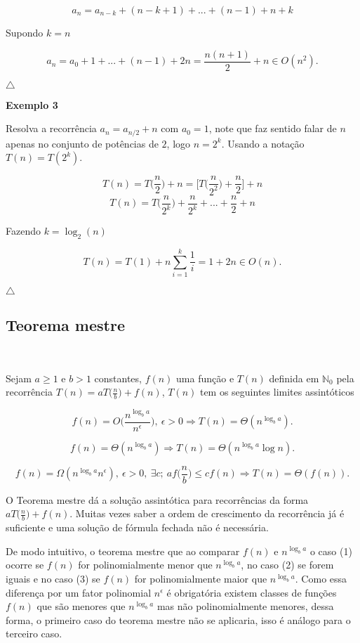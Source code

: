 \[a_n = a_{n-k} + (n-k+1) + ... + (n-1) + n + k\]

Supondo $k=n$

\[a_n = a_0 + 1 + ... + (n-1) + 2n = \frac{n(n+1)}{2} + n \in O(n^2).\]

{\raggedleft $\bigtriangleup$ \par}

\textbf{Exemplo 3}

Resolva a recorrência $a_n = a_{n/2} + n$ com $a_0 = 1$, note que faz sentido falar de $n$ apenas no conjunto de potências de $2$, logo $n=2^k$. Usando a notação $T(n)=T(2^k)$.

\[T(n) = T \Bigr(\frac{n}{2}\Bigr) + n = \Bigr[T\Bigr(\frac{n}{2^2}\Bigr) + \frac{n}{2}\Bigr] + n\]
\[T(n) = T\Bigr(\frac{n}{2^k}\Bigr) + \frac{n}{2^k} + ... + \frac{n}{2} + n\]

Fazendo $k=\log_2(n)$

\[T(n) = T(1) + n\sum_{i=1}^k \frac{1}{i} = 1 + 2n \in O(n).\]

{\raggedleft $\bigtriangleup$ \par}

\subsection{Teorema mestre}
\

Sejam $a\geq 1$ e $b>1$ constantes, $f(n)$ uma função e $T(n)$ definida em $\mathbb{N}_0$ pela recorrência $T(n) = aT\Bigr(\frac{n}{b}\Bigr) + f(n)$, $T(n)$ tem os seguintes limites assintóticos

\[f(n) = O\Bigr(\frac{n^{\log_ba}}{n^\epsilon}\Bigr), \ \epsilon>0 \Rightarrow T(n) = \Theta(n^{\log_ba}).\]

\[f(n) = \Theta(n^{\log_ba}) \Rightarrow T(n) = \Theta(n^{\log_ba} \log n).\]

\[f(n) = \Omega(n^{\log_ba}n^\epsilon), \ \epsilon>0, \ \exists c; \ af\Bigr(\frac{n}{b}\Bigr)\leq cf(n) \Rightarrow T(n) = \Theta(f(n)).\]


O Teorema mestre dá a solução assintótica para recorrências da forma $aT\Bigr(\frac{n}{b}\Bigr) + f(n)$. Muitas vezes saber a ordem de crescimento da recorrência já é suficiente e uma solução de fórmula fechada não é necessária.

De modo intuitivo, o teorema mestre que ao comparar $f(n)$ e $n^{\log_ba}$ o caso (1) ocorre se $f(n)$ for polinomialmente menor que $n^{\log_ba}$, no caso (2) se forem iguais e no caso (3) se $f(n)$ for polinomialmente maior que $n^{\log_ba}$. Como essa diferença por um fator polinomial $n^\epsilon$ é obrigatória existem classes de funções $f(n)$ que são menores que $n^{\log_ba}$ mas não polinomialmente menores, dessa forma, o primeiro caso do teorema mestre não se aplicaria, isso é análogo para o terceiro caso.

